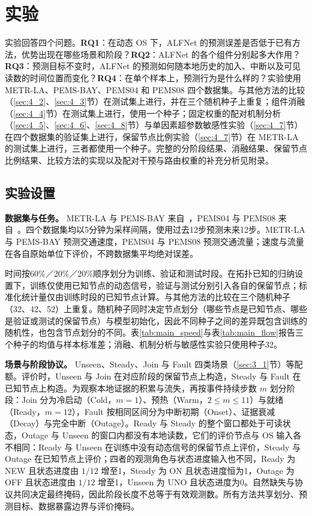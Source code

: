 \section{实验}\label{sec:exp}
实验回答四个问题。\textbf{RQ1}：在动态 OS 下，ALFNet 的预测误差是否低于已有方法，优势出现在哪些场景和阶段？\textbf{RQ2}：ALFNet 的各个组件分别起多大作用？\textbf{RQ3}：预测目标不变时，ALFNet 的预测如何随本地历史的加入、中断以及可见读数的时间位置而变化？\textbf{RQ4}：在单个样本上，预测行为是什么样的？实验使用 METR-LA、PEMS-BAY、PEMS04 和 PEMS08 四个数据集。与其他方法的比较（\ref{sec:4_2}、\ref{sec:4_3}节）在测试集上进行，并在三个随机种子上重复；组件消融（\ref{sec:4_4}节）在测试集上进行，使用一个种子；固定权重的配对机制分析（\ref{sec:4_5}、\ref{sec:4_6}、\ref{sec:4_8}节）与单因素超参数敏感性实验（\ref{sec:4_7}节）在四个数据集的验证集上进行，保留节点比例实验（\ref{sec:4_7}节）在 METR-LA 的测试集上进行，三者都使用一个种子。完整的分阶段结果、消融结果、保留节点比例结果、比较方法的实现以及配对干预与路由权重的补充分析见附录。

\subsection{实验设置}\label{sec:4_1}

\textbf{数据集与任务。} METR-LA 与 PEMS-BAY 来自~\citep{li2018diffusion}，PEMS04 与 PEMS08 来自~\citep{guo2019attention}。四个数据集均以5分钟为采样间隔，使用过去12步预测未来12步。METR-LA 与 PEMS-BAY 预测交通速度，PEMS04 与 PEMS08 预测交通流量；速度与流量在各自原始单位下评价，不跨数据集平均绝对误差。

\begin{center}
\small
\resizebox{\linewidth}{!}{}
\end{center}

时间按60\%／20\%／20\%顺序划分为训练、验证和测试时段。在拓扑已知的归纳设置下，训练仅使用已知节点的动态信号，验证与测试分别引入各自的保留节点；标准化统计量仅由训练时段的已知节点计算。与其他方法的比较在三个随机种子（32、42、52）上重复。随机种子同时决定节点划分（哪些节点是已知节点、哪些是验证或测试的保留节点）与模型初始化，因此不同种子之间的差异既包含训练的随机性，也包含节点划分的不同。表\ref{tab:main_speed}与表\ref{tab:main_flow}报告三个种子的均值与样本标准差；消融、机制分析与敏感性实验只使用种子32。

\textbf{场景与阶段协议。} Unseen、Steady、Join 与 Fault 四类场景（\ref{sec:3_1}节）等配额。评价时，Unseen 与 Join 在对应阶段的保留节点上构造，Steady 与 Fault 在已知节点上构造。为观察本地证据的积累与流失，再按事件持续步数 $m$ 划分阶段：Join 分为冷启动（Cold，$m=1$）、预热（Warm，$2\le m\le 11$）与就绪（Ready，$m=12$），Fault 按相同区间分为中断初期（Onset）、证据衰减（Decay）与完全中断（Outage）。Ready 与 Steady 的整个窗口都处于可读状态，Outage 与 Unseen 的窗口内都没有本地读数，它们的评价节点与 OS 输入各不相同：Ready 与 Unseen 在训练中没有动态信号的保留节点上评价，Steady 与 Outage 在已知节点上评价；四者的观测角色与状态进度输入也不同，Ready 为 NEW 且状态进度由 $1/12$ 增至1，Steady 为 ON 且状态进度恒为1，Outage 为 OFF 且状态进度由 $1/12$ 增至1，Unseen 为 UNO 且状态进度为0。自然缺失与协议共同决定最终掩码，因此阶段长度不总等于有效观测数。所有方法共享划分、预测目标、数据暴露边界与评价掩码。

